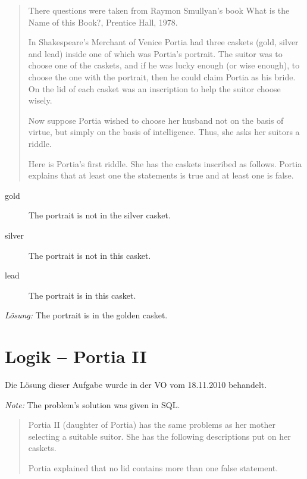 \documentclass[11pt,a4paper]{article}
\theoremstyle{area}
\begin{document}
\begin{quote}
  There questions were taken from Raymon Smullyan's book What is the Name
  of this Book?, Prentice Hall, 1978.

  In Shakespeare's Merchant of Venice Portia had three caskets (gold, silver
  and lead) inside one of which was Portia's portrait. The suitor was to
  choose one of the caskets, and if he was lucky enough (or wise enough),
  to choose the one with the portrait, then he could claim Portia as his
  bride. On the lid of each casket was an inscription to help the suitor
  choose wisely.

  Now suppose Portia wished to choose her husband not on the basis of
  virtue, but simply on the basis of intelligence. Thus, she asks her
  suitors a riddle.

  Here is Portia's first riddle. She has the caskets inscribed as follows.
  Portia explains that at least one the statements is true and at least
  one is false.
\end{quote}

\begin{description}
  \item[gold] The portrait is not in the silver casket.
  \item[silver] The portrait is not in this casket.
  \item[lead] The portrait is in this casket.
\end{description}

\emph{Lösung:} The portrait is in the golden casket.

\section{Logik -- Portia II}

Die Lösung dieser Aufgabe wurde in der VO vom 18.11.2010 behandelt.

\emph{Note:} The problem's solution was given in SQL.

\begin{quote}
  Portia II (daughter of Portia) has the same problems as her mother
  selecting a suitable suitor. She has the following descriptions
  put on her caskets.

  Portia explained that no lid contains more than one false statement.
\end{quote}
\end{document}
